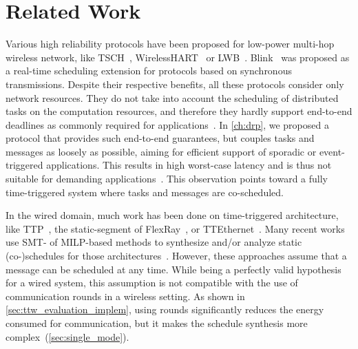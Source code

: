 
\section{Related Work}
\label{sec:ttw_relWork}

Various high reliability protocols have been proposed for low-power multi-hop wireless network, like TSCH~\cite{watteyne2017Teaching}, WirelessHART~\cite{wirelessHART} or LWB~\cite{ferrari2012LWB}.
Blink~\cite{zimmerling2017Blink} was proposed as a real-time scheduling extension for protocols based on synchronous transmissions.
Despite their respective benefits, all these protocols consider only network resources. They do not take into account the scheduling of distributed tasks on the computation resources, and therefore they hardly support end-to-end deadlines as commonly required for \cps applications~\cite{akerberg2011Future}.
In \cref{ch:drp}, we proposed \DRP a protocol that provides such end-to-end guarantees, but couples tasks and messages as loosely as possible, aiming for efficient support of sporadic or event-triggered applications.
This results in high worst-case latency and is thus not suitable for demanding \cps applications~\cite{akerberg2011Future}.
This observation points toward a fully time-triggered system where tasks and messages are co-scheduled.


In the wired domain, much work has been done on time-triggered architecture, like TTP~\cite{kopetz1993TTP}, the static-segment of FlexRay~\cite{flexray2013ISO}, or TTEthernet~\cite{kopetz2005TimeTriggered}.
Many recent works use SMT- of MILP-based methods to synthesize and/or analyze static (co-)schedules for those architectures~\cite{steiner2010evaluation,craciunas2016Combined,ashjaei2017Designing,tamas2012Synthesis,zhang2014Task}.
However, these approaches assume that a message can be scheduled at any time. While being a perfectly valid hypothesis for a wired system, this assumption is not compatible with the use of communication rounds in a wireless setting.
As shown in \cref{sec:ttw_evaluation_implem}, using rounds significantly reduces the energy consumed for communication, but it makes the schedule synthesis more complex~(\cref{sec:single_mode}).
